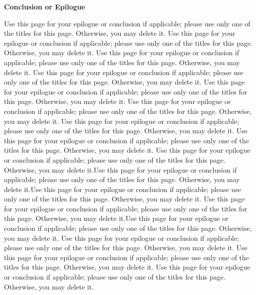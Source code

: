 
\begin{center}
\pagebreak
\vspace*{5\baselineskip}
\textbf{\large Conclusion or Epilogue}
\end{center}


\begin{flushleft}
\hspace{10mm}Use this page for your epilogue or conclusion if applicable; please use only one of the titles for this page. Otherwise, you may delete it.
Use this page for your epilogue or conclusion if applicable; please use only one of the titles for this page. Otherwise, you may delete it.
Use this page for your epilogue or conclusion if applicable; please use only one of the titles for this page. Otherwise, you may delete it.
Use this page for your epilogue or conclusion if applicable; please use only one of the titles for this page. Otherwise, you may delete it.
Use this page for your epilogue or conclusion if applicable; please use only one of the titles for this page. Otherwise, you may delete it.
Use this page for your epilogue or conclusion if applicable; please use only one of the titles for this page. Otherwise, you may delete it.
Use this page for your epilogue or conclusion if applicable; please use only one of the titles for this page. Otherwise, you may delete it.
Use this page for your epilogue or conclusion if applicable; please use only one of the titles for this page. Otherwise, you may delete it.
Use this page for your epilogue or conclusion if applicable; please use only one of the titles for this page. Otherwise, you may delete it.Use this page for your epilogue or conclusion if applicable; please use only one of the titles for this page. Otherwise, you may delete it.Use this page for your epilogue or conclusion if applicable; please use only one of the titles for this page. Otherwise, you may delete it.
Use this page for your epilogue or conclusion if applicable; please use only one of the titles for this page. Otherwise, you may delete it.Use this page for your epilogue or conclusion if applicable; please use only one of the titles for this page. Otherwise, you may delete it.
Use this page for your epilogue or conclusion if applicable; please use only one of the titles for this page. Otherwise, you may delete it.
Use this page for your epilogue or conclusion if applicable; please use only one of the titles for this page. Otherwise, you may delete it.
Use this page for your epilogue or conclusion if applicable; please use only one of the titles for this page. Otherwise, you may delete it.

\end{flushleft}
